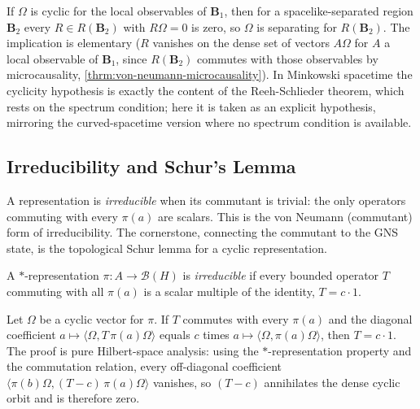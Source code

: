 \begin{theorem}
    \label{thrm:statistical-independence}
    \leanok
    If $\Omega$ is cyclic for the local observables of $\mathbf{B}_1$, then for a spacelike-separated region $\mathbf{B}_2$ every $R \in R(\mathbf{B}_2)$ with $R\Omega = 0$ is zero, so $\Omega$ is separating for $R(\mathbf{B}_2)$. The implication is elementary ($R$ vanishes on the dense set of vectors $A\Omega$ for $A$ a local observable of $\mathbf{B}_1$, since $R(\mathbf{B}_2)$ commutes with those observables by microcausality, \ref{thrm:von-neumann-microcausality}). In Minkowski spacetime the cyclicity hypothesis is exactly the content of the Reeh-Schlieder theorem, which rests on the spectrum condition; here it is taken as an explicit hypothesis, mirroring the curved-spacetime version where no spectrum condition is available.
\end{theorem}

\subsection{Irreducibility and Schur's Lemma}

A representation is \emph{irreducible} when its commutant is trivial: the only operators commuting with every $\pi(a)$ are scalars. This is the von Neumann (commutant) form of irreducibility. The cornerstone, connecting the commutant to the GNS state, is the topological Schur lemma for a cyclic representation.

\begin{definition}
    \label{def:irreducible-representation}
    \leanok
    A $*$-representation $\pi : A \to \mathcal{B}(H)$ is \emph{irreducible} if every bounded operator $T$ commuting with all $\pi(a)$ is a scalar multiple of the identity, $T = c \cdot 1$.
\end{definition}

\begin{theorem}
    \label{thrm:schur-lemma}
    \leanok
    Let $\Omega$ be a cyclic vector for $\pi$. If $T$ commutes with every $\pi(a)$ and the diagonal coefficient $a \mapsto \langle \Omega, T\,\pi(a)\Omega\rangle$ equals $c$ times $a \mapsto \langle \Omega, \pi(a)\Omega\rangle$, then $T = c \cdot 1$. The proof is pure Hilbert-space analysis: using the $*$-representation property and the commutation relation, every off-diagonal coefficient $\langle \pi(b)\Omega, (T - c)\,\pi(a)\Omega\rangle$ vanishes, so $(T - c)$ annihilates the dense cyclic orbit and is therefore zero.
\end{theorem}

